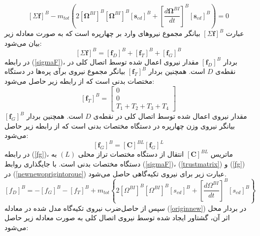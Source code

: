 \begin{equation}\label{newnewoprigintorque}
	\left[\Sigma \boldsymbol f\right]^B - 
	m_{tot}\left(2
	\left[\boldsymbol\Omega^{BI}\right]^B
	\left[\boldsymbol\Omega^{BI}\right]^B
	\left[\boldsymbol s_{cd}\right]^B+
	\left[\dfrac{d\boldsymbol\Omega^{BI}}{dt}\right]^B
	\left[\boldsymbol s_{cd}\right]^B
	\right) = 0
\end{equation}
عبارت 
$\left[\Sigma \boldsymbol f\right]^B$
بیانگر مجموع نیروهای وارد بر چهارپره است که به صورت معادله زیر بیان می‌شود:
\begin{equation}\label{sigmaF}
	\left[\Sigma \boldsymbol f\right]^B = \left[\boldsymbol f_D\right]^B+\left[\boldsymbol f_T\right]^B+
	\left[\boldsymbol f_G\right]^B
\end{equation}
در رابطه 
(\ref{sigmaF})، بردار 
$\left[\boldsymbol f_D\right]^B$
مقدار نیروی اعمال‌ شده توسط اتصال کلی در نقطه‌ی
$D$
است. همچنین  بردار 
$\left[\boldsymbol f_T\right]^B$
بیانگر مجموع نیروی برآی پره‌ها در دستگاه مختصات بدنی است که از رابطه زیر حاصل می‌شود:
\begin{equation}\label{trustmatrix}
	\left[\boldsymbol f_T\right]^B = \begin{bmatrix}
		0\\0\\
		T_1+T_2+T_3+T_4
	\end{bmatrix}
\end{equation}
مقدار نیروی اعمال‌ شده توسط اتصال کلی در نقطه‌ی
$D$
است. همچنین  بردار 
$\left[\boldsymbol f_G\right]^B$
بیانگر نیروی وزن چهارپره در دستگاه مختصات بدنی است که از رابطه زیر حاصل می‌شود:
\begin{equation}\label{fg}
	\left[\boldsymbol f_G\right]^B = \left[\boldsymbol C\right]^{BL}
	\left[\boldsymbol f_G\right]^L
\end{equation}
در رابطه
(\ref{fg})،
ماتریس
$\left[\boldsymbol C\right]^{BL}$
 انتقال از دستگاه مختصات تراز محلی
$(L)$
 به دستگاه مختصات بدنی است. با جایگذاری روابط
(\ref{sigmaF})،
(\ref{trustmatrix}) و
(\ref{fg})
در
(\ref{newnewoprigintorque})
عبارت زیر برای نیروی تكیه‌گاهی حاصل می‌شود.
\begin{equation}\label{originnew}
	\left[f_D\right]^B = 
	-\left[f_G\right]^B-
	\left[f_T\right]^B+
	m_{tot}\left\{2
	\left[\Omega^{BI}\right]^B
	\left[\Omega^{BI}\right]^B
	\left[s_{cd}\right]^B+
	\left[\dfrac{d\Omega^{BI}}{dt}\right]^B
	\left[s_{cd}\right]^B
	\right\}
\end{equation}
سپس از حاصل‌ضرب نیروی تكیه‌گاه مدل‌ شده در معادله
(\ref{originnew})
 در بردار محل اثر آن، گشتاور ایجاد شده
توسط نیروی اتصال کلی به صورت معادله زیر حاصل می‌شود:
